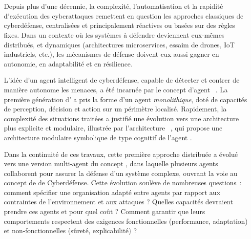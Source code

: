 \clearpage
\thispagestyle{empty}
\null
\newpage

\cleardoublepage
{}
\cleardoublepage
{}

\

\vspace{1em}

\bigskip

\\

\noindent
Depuis plus d'une décennie, la complexité, l'automatisation et la rapidité d'exécution des cyberattaques remettent en question les approches classiques de cyberdéfense, centralisées et principalement réactives ou basées sur des règles fixes. Dans un contexte où les systèmes à défendre deviennent eux-mêmes distribués, et dynamiques (architectures microservices, essaim de drones, IoT industriels, etc.), les mécanismes de défense doivent eux aussi gagner en autonomie, en adaptabilité et en résilience.

L'idée d'un agent intelligent de cyberdéfense, capable de détecter et contrer de manière autonome les menaces, a été incarnée par le concept d'agent ~\cite{Kott2023}. La première génération d' a pris la forme d'un agent \textit{monolithique}, doté de capacités de perception, décision et action sur un périmètre localisé. Rapidement, la complexité des situations traitées a justifié une évolution vers une architecture plus explicite et modulaire, illustrée par l'architecture ~\cite{Kott2023}, qui propose une architecture modulaire symbolique de type cognitif de l'agent .

Dans la continuité de ces travaux, cette première approche distribuée a évolué vers une version multi-agent du concept , dans laquelle plusieurs agents collaborent pour assurer la défense d'un système complexe, ouvrant la voie au concept de  de Cyberdéfense. Cette évolution soulève de nombreuses questions~: comment spécifier une organisation adapté entre agents par rapport aux contraintes de l'environnement et aux attaques ? Quelles capacités devraient prendre ces agents et pour quel coût ? Comment garantir que leurs comportements respectent des exigences fonctionnelles (performance, adaptation) et non-fonctionnelles (sûreté, explicabilité) ?

